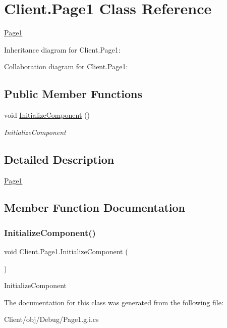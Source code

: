 \hypertarget{class_client_1_1_page1}{}\section{Client.\+Page1 Class Reference}
\label{class_client_1_1_page1}


\hyperlink{class_client_1_1_page1}{Page1}  




Inheritance diagram for Client.\+Page1\+:


Collaboration diagram for Client.\+Page1\+:
\subsection*{Public Member Functions}
\begin{DoxyCompactItemize}
\item 
void \hyperlink{class_client_1_1_page1_aebfa7ecad8d4becb32982b8f0a1ee9f8}{Initialize\+Component} ()
\begin{DoxyCompactList}\small\item\em Initialize\+Component \end{DoxyCompactList}\end{DoxyCompactItemize}


\subsection{Detailed Description}
\hyperlink{class_client_1_1_page1}{Page1} 



\subsection{Member Function Documentation}
\mbox{\label{class_client_1_1_page1_aebfa7ecad8d4becb32982b8f0a1ee9f8}} 
\subsubsection{\texorpdfstring{Initialize\+Component()}{InitializeComponent()}}
{\footnotesize\ttfamily void Client.\+Page1.\+Initialize\+Component (\begin{DoxyParamCaption}{ }\end{DoxyParamCaption})\hspace{0.3cm}{\ttfamily [inline]}}



Initialize\+Component 



The documentation for this class was generated from the following file\+:\begin{DoxyCompactItemize}
\item 
Client/obj/\+Debug/Page1.\+g.\+i.\+cs\end{DoxyCompactItemize}
